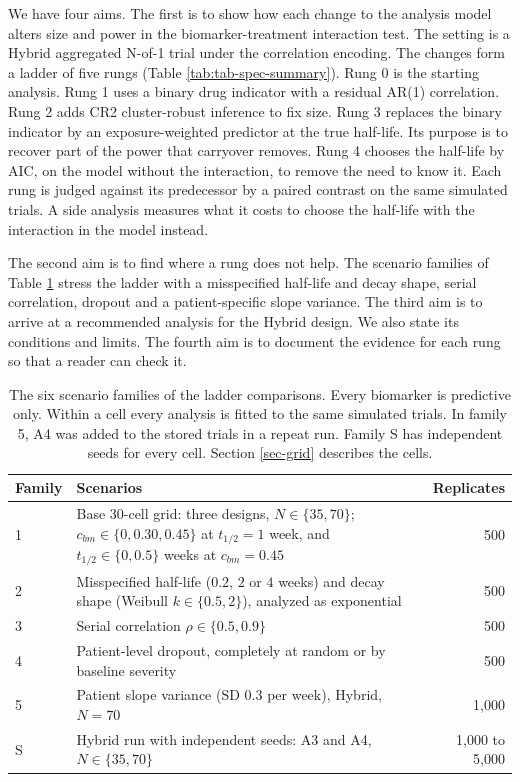 \documentclass[
  11pt,
]{article}
\begin{document}
We have four aims. The first is to show how each change to the
analysis model alters size and power in the biomarker-treatment
interaction test. The setting is a Hybrid aggregated N-of-1 trial
under the correlation encoding. The changes form a ladder of five rungs (Table
\ref{tab:tab-spec-summary}). Rung 0 is the starting analysis. Rung 1
uses a binary drug indicator with a residual AR(1) correlation. Rung 2
adds CR2 cluster-robust inference to fix size. Rung 3 replaces the
binary indicator by an exposure-weighted predictor at the true
half-life. Its purpose is to recover part of the power that carryover
removes. Rung 4 chooses the half-life by AIC, on the model without the
interaction, to remove the need to know it. Each rung is judged
against its predecessor by a paired contrast on the same simulated
trials. A side analysis measures what it costs to
choose the half-life with the interaction in the model instead.

The second aim is to find where a rung does not help. The scenario
families of Table \ref{tab:tab-families} stress the ladder with a
misspecified half-life and decay shape, serial correlation, dropout
and a patient-specific slope variance. The third aim is to arrive at
a recommended analysis for the Hybrid design. We also state its
conditions and limits. The fourth aim is to document the evidence for
each rung so that a reader can check it.

\begin{table}
\centering
\caption{\label{tab:tab-families}The six scenario families of the ladder comparisons.
    Every biomarker is predictive only. Within a cell every analysis
    is fitted to the same simulated trials. In family 5, A4 was added
    to the stored trials in a repeat run. Family S has
    independent seeds for every cell. Section \ref{sec-grid}
    describes the cells.}
\centering
\fontsize{9}{11}\selectfont
\begin{tabular}[t]{l>{\raggedright\arraybackslash}p{9.5cm}r}
\toprule
Family & Scenarios & Replicates\\
\midrule
1 & Base 30-cell grid: three designs, $N \in \{35, 70\}$; $c_{bm} \in \{0, 0.30, 0.45\}$ at $t_{1/2} = 1$ week, and $t_{1/2} \in \{0, 0.5\}$ weeks at $c_{bm} = 0.45$ & 500\\
2 & Misspecified half-life ($0.2$, $2$ or $4$ weeks) and decay shape (Weibull $k \in \{0.5, 2\}$), analyzed as exponential & 500\\
3 & Serial correlation $\rho \in \{0.5, 0.9\}$ & 500\\
4 & Patient-level dropout, completely at random or by baseline severity & 500\\
5 & Patient slope variance (SD 0.3 per week), Hybrid, $N = 70$ & 1,000\\
S & Hybrid run with independent seeds: A3 and A4, $N \in \{35, 70\}$ & 1,000 to 5,000\\
\bottomrule
\end{tabular}
\end{table}
\end{document}
